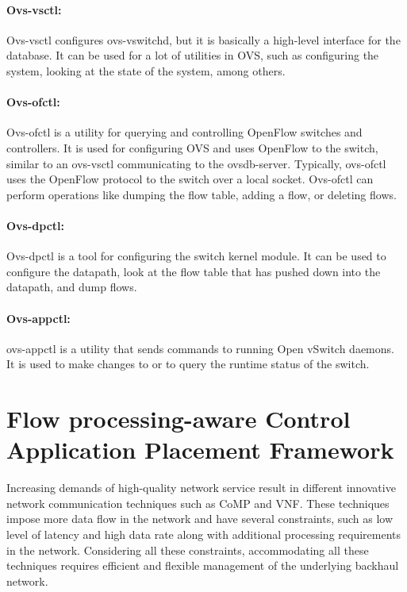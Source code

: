 \paragraph{Ovs-vsctl:}
Ovs-vsctl configures ovs-vswitchd, but it is basically a high-level interface for the database. It can be used for a lot of utilities in OVS, such as configuring the system, looking at the state of the system, among others.

\paragraph{Ovs-ofctl:}
Ovs-ofctl is a utility for querying and controlling OpenFlow switches and controllers. It is used for configuring OVS and uses OpenFlow to the switch, similar to an ovs-vsctl communicating to the ovsdb-server. Typically, ovs-ofctl uses the OpenFlow protocol to the switch over a local socket. Ovs-ofctl can perform operations like dumping the flow table, adding a flow, or deleting flows.

\paragraph{Ovs-dpctl:}
Ovs-dpctl is a tool for configuring the switch kernel module. It can be used to configure the datapath, look at the flow table that has pushed down into the datapath, and dump flows.

\paragraph{Ovs-appctl:}
ovs-appctl is a utility that sends commands to running Open vSwitch daemons. It is used to make changes to or to query the runtime status of the switch.

\section{Flow processing-aware Control Application Placement Framework}\label{sec:fcpf}
Increasing demands of high-quality network service result in different innovative network communication techniques such as CoMP and VNF. These techniques impose more data flow in the network and have several constraints, such as low level of latency and high data rate along with additional processing requirements in the network. Considering all these constraints, accommodating all these techniques requires efficient and flexible management of the underlying backhaul network. 

